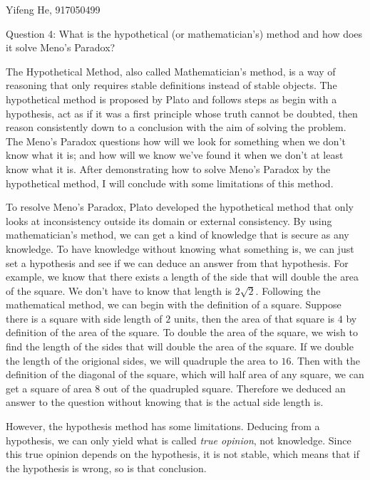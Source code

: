 \documentclass[11pt]{article}
\begin{document}
\begin{center}
    Yifeng He, 917050499
\end{center}

\begin{center}
    Question 4:
    What is the hypothetical (or mathematician's) method and how does it solve Meno's Paradox?
\end{center}

The Hypothetical Method, also called Mathematician's method,
is a way of reasoning that only requires stable definitions instead of stable objects.
The hypothetical method is proposed by Plato and follows steps as begin with a hypothesis,
act as if it was a first principle whose truth cannot be doubted,
then reason consistently down to a conclusion with the aim of solving the problem.
The Meno's Paradox questions how will we look for something when we don't know what it is;
and how will we know we've found it when we don't at least know what it is. 
After demonstrating how to solve Meno's Paradox by the hypothetical method, 
I will conclude with some limitations of this method.

To resolve Meno's Paradox,
Plato developed the hypothetical method that
only looks at inconsistency outside its domain or external consistency.
By using mathematician's method,
we can get a kind of knowledge that is secure as any knowledge.
To have knowledge without knowing what something is,
we can just set a hypothesis and see if we can deduce an answer from that hypothesis.
For example, we know that there exists a length of the side that will double the area of the square.
We don't have to know that length is $2\sqrt{2}$.
Following the mathematical method,
we can begin with the definition of a square.
Suppose there is a square with side length of $2$ units,
then the area of that square is $4$ by definition of the area of the square.
To double the area of the square,
we wish to find the length of the sides that will double the area of the square.
If we double the length of the origional sides,
we will quadruple the area to $16$.
Then with the definition of the diagonal of the square, which will half area of any square,
we can get a square of area $8$ out of the quadrupled square.
Therefore we deduced an answer to the question without knowing that is the actual side length is.

However, the hypothesis method has some limitations.
Deducing from a hypothesis,
we can only yield what is called \textit{true opinion},
not knowledge.
Since this true opinion depends on the hypothesis,
it is not stable,
which means that if the hypothesis is wrong, so is that conclusion.
\end{document}
